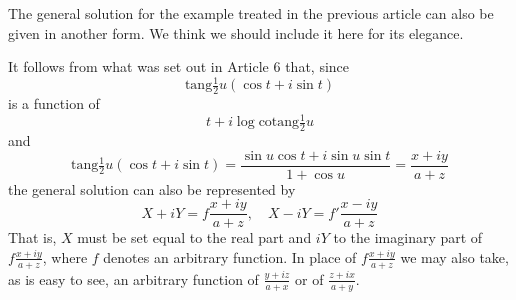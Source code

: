 The general solution for the example treated in the previous article can also be given in another form. We think we should include it here for its elegance.

It follows from what was set out in Article 6 that, since
\[
\mathrm{tang}\tfrac{1}{2}u(\cos t+i\sin t)
\]
\noindent is a function of
\[
t+i\log\mathrm{cotang}\tfrac{1}{2}u
\]
\noindent and
\[
\mathrm{tang}\tfrac{1}{2}u(\cos t+i\sin t)=\frac{\sin u\cos t+i\sin u\sin t}{1+\cos u}=\frac{x+iy}{a+z}
\]
\noindent the general solution can also be represented by
\[
X+iY=f\frac{x+iy}{a+z},\quad X-iY=f'\frac{x-iy}{a+z}
\]
\noindent That is, \(X\) must be set equal to the real part and \(iY\) to the imaginary part of \(f\frac{x+iy}{a+z}\), where \(f\) denotes an arbitrary function. In place of \(f\frac{x+iy}{a+z}\) we may also take, as is easy to see, an arbitrary function of \(\frac{y+iz}{a+x}\) or of \(\frac{z+ix}{a+y}\).

